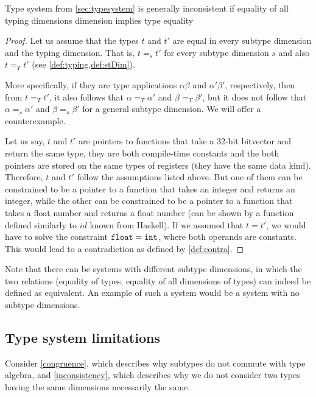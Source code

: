 \begin{lemma}Type system from \cref{sec:typesystem} is generally inconsistent if equality of all typing dimensions dimension implies type equality
    \label{inconsistency}
    \begin{proof}
        Let us assume that the types $t$ and $t'$ are equal in every subtype dimension and the typing dimension. That is, $t =_s t'$ for every subtype dimension $s$ and also $t =_T t'$ (see \cref{def:typing,def:stDim}).

        More specifically, if they are type applications $\alpha \beta$ and $\alpha' \beta'$, respectively, then from $t =_T t'$, it also follows that $\alpha =_T \alpha'$ and $\beta =_T \beta'$, but it does not follow that $\alpha =_s \alpha'$ and $\beta =_s \beta'$ for a general subtype dimension. We will offer a counterexample.

        Let us say, $t$ and $t'$ are pointers to functions that take a 32-bit bitvector and return the same type, they are both compile-time constants and the both pointers are stored on the same types of registers (they have the same data kind). Therefore, $t$ and $t'$ follow the assumptions listed above. But one of them can be constrained to be a pointer to a function that takes an integer and returns an integer, while the other can be constrained to be a pointer to a function that takes a float number and returns a float number (can be shown by a function defined similarly to $id$ known from Haskell). If we assumed that $t = t'$, we would have to solve the constraint $\mathtt{float} = \mathtt{int}$, where both operands are constants. This would lead to a contradiction as defined by \cref{def:contra}.
    \end{proof}
\end{lemma}

Note that there can be systems with different subtype dimensions, in which the two relations (equality of types, equality of all dimensions of types) can indeed be defined as equivalent. An example of such a system would be a system with no subtype dimensions.

\subsection{Type system limitations}
\label{sec:tsLims}

Consider \cref{congruence}, which describes why subtypes do not commute with type algebra, and \cref{inconsistency}, which describes why we do not consider two types having the same dimensions necessarily the same.

